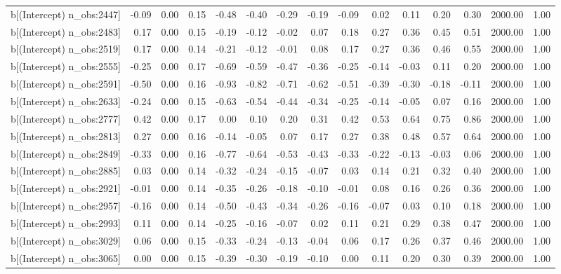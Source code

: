 \begin{table}[ht]
\begin{tabular}{rrrrrrrrrrrrrrr}
  b[(Intercept) n\_obs:2447] & -0.09 & 0.00 & 0.15 & -0.48 & -0.40 & -0.29 & -0.19 & -0.09 & 0.02 & 0.11 & 0.20 & 0.30 & 2000.00 & 1.00 \\ 
  b[(Intercept) n\_obs:2483] & 0.17 & 0.00 & 0.15 & -0.19 & -0.12 & -0.02 & 0.07 & 0.18 & 0.27 & 0.36 & 0.45 & 0.51 & 2000.00 & 1.00 \\ 
  b[(Intercept) n\_obs:2519] & 0.17 & 0.00 & 0.14 & -0.21 & -0.12 & -0.01 & 0.08 & 0.17 & 0.27 & 0.36 & 0.46 & 0.55 & 2000.00 & 1.00 \\ 
  b[(Intercept) n\_obs:2555] & -0.25 & 0.00 & 0.17 & -0.69 & -0.59 & -0.47 & -0.36 & -0.25 & -0.14 & -0.03 & 0.11 & 0.20 & 2000.00 & 1.00 \\ 
  b[(Intercept) n\_obs:2591] & -0.50 & 0.00 & 0.16 & -0.93 & -0.82 & -0.71 & -0.62 & -0.51 & -0.39 & -0.30 & -0.18 & -0.11 & 2000.00 & 1.00 \\ 
  b[(Intercept) n\_obs:2633] & -0.24 & 0.00 & 0.15 & -0.63 & -0.54 & -0.44 & -0.34 & -0.25 & -0.14 & -0.05 & 0.07 & 0.16 & 2000.00 & 1.00 \\ 
  b[(Intercept) n\_obs:2777] & 0.42 & 0.00 & 0.17 & 0.00 & 0.10 & 0.20 & 0.31 & 0.42 & 0.53 & 0.64 & 0.75 & 0.86 & 2000.00 & 1.00 \\ 
  b[(Intercept) n\_obs:2813] & 0.27 & 0.00 & 0.16 & -0.14 & -0.05 & 0.07 & 0.17 & 0.27 & 0.38 & 0.48 & 0.57 & 0.64 & 2000.00 & 1.00 \\ 
  b[(Intercept) n\_obs:2849] & -0.33 & 0.00 & 0.16 & -0.77 & -0.64 & -0.53 & -0.43 & -0.33 & -0.22 & -0.13 & -0.03 & 0.06 & 2000.00 & 1.00 \\ 
  b[(Intercept) n\_obs:2885] & 0.03 & 0.00 & 0.14 & -0.32 & -0.24 & -0.15 & -0.07 & 0.03 & 0.14 & 0.21 & 0.32 & 0.40 & 2000.00 & 1.00 \\ 
  b[(Intercept) n\_obs:2921] & -0.01 & 0.00 & 0.14 & -0.35 & -0.26 & -0.18 & -0.10 & -0.01 & 0.08 & 0.16 & 0.26 & 0.36 & 2000.00 & 1.00 \\ 
  b[(Intercept) n\_obs:2957] & -0.16 & 0.00 & 0.14 & -0.50 & -0.43 & -0.34 & -0.26 & -0.16 & -0.07 & 0.03 & 0.10 & 0.18 & 2000.00 & 1.00 \\ 
  b[(Intercept) n\_obs:2993] & 0.11 & 0.00 & 0.14 & -0.25 & -0.16 & -0.07 & 0.02 & 0.11 & 0.21 & 0.29 & 0.38 & 0.47 & 2000.00 & 1.00 \\ 
  b[(Intercept) n\_obs:3029] & 0.06 & 0.00 & 0.15 & -0.33 & -0.24 & -0.13 & -0.04 & 0.06 & 0.17 & 0.26 & 0.37 & 0.46 & 2000.00 & 1.00 \\ 
  b[(Intercept) n\_obs:3065] & 0.00 & 0.00 & 0.15 & -0.39 & -0.30 & -0.19 & -0.10 & 0.00 & 0.11 & 0.20 & 0.30 & 0.39 & 2000.00 & 1.00 \\ 

\end{tabular}
\end{table}
